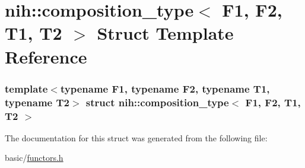 \hypertarget{structnih_1_1composition__type}{
\section{nih\-:\-:composition\-\_\-type$<$ \-F1, \-F2, \-T1, \-T2 $>$ \-Struct \-Template \-Reference}
\label{structnih_1_1composition__type}
}
\subsubsection*{template$<$typename F1, typename F2, typename T1, typename T2$>$ struct nih\-::composition\-\_\-type$<$ F1, F2, T1, T2 $>$}



\-The documentation for this struct was generated from the following file\-:\begin{DoxyCompactItemize}
\item 
basic/\hyperlink{functors_8h}{functors.\-h}\end{DoxyCompactItemize}
